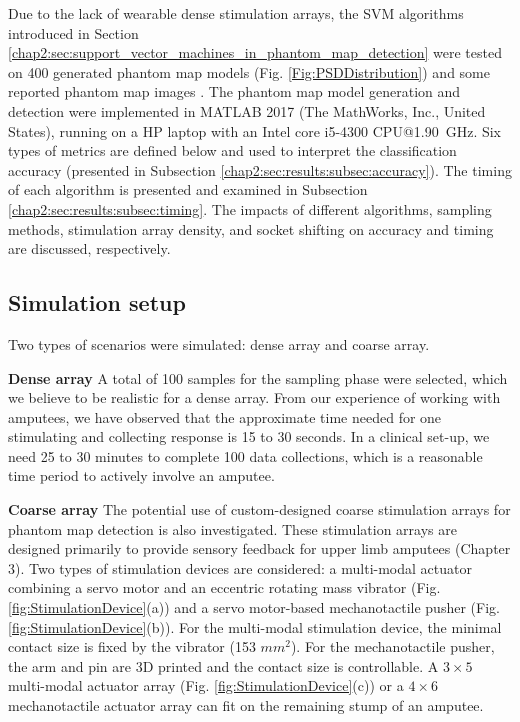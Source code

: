Due to the lack of wearable dense stimulation arrays, the SVM algorithms introduced in Section \ref{chap2:sec:support_vector_machines_in_phantom_map_detection} were tested on 400 generated phantom map models (Fig. \ref{Fig:PSDDistribution}) and some reported phantom map images \cite{antfolk2012sensory, chai2015characterization,bjorkman2016sensory}.
The phantom map model generation and detection were implemented in MATLAB 2017 (The MathWorks, Inc., United States), running on a HP laptop with an Intel core i5-4300 CPU@\SI{1.90}{GHz}.
Six types of metrics are defined below and used to interpret the classification accuracy (presented in Subsection \ref{chap2:sec:results:subsec:accuracy}). The timing of each algorithm is presented and examined in Subsection \ref{chap2:sec:results:subsec:timing}. 
The  impacts of different algorithms, sampling methods,  stimulation array density, and socket shifting on accuracy and timing are discussed, respectively.


\subsection{Simulation setup}
Two types of scenarios were simulated: dense array and coarse array.

\textbf{Dense array} 
A total of 100 samples for the sampling phase were selected, which we believe to be realistic for a dense array.
From our experience of working with amputees, we have observed that the approximate time needed for one stimulating and collecting response is 15 to 30 seconds. In a clinical set-up, we need 25 to 30 minutes to complete 100 data collections, which is a reasonable time period to actively involve an amputee. 

\textbf{Coarse array} 
The potential use of custom-designed coarse stimulation arrays for phantom map detection is also investigated. These stimulation arrays are designed primarily to provide sensory feedback for upper limb amputees (Chapter 3). Two types of stimulation devices are considered: a multi-modal actuator combining a servo motor and an eccentric rotating mass vibrator (Fig. \ref{fig:StimulationDevice}(a)) and a servo motor-based mechanotactile pusher (Fig. \ref{fig:StimulationDevice}(b)).  For the multi-modal stimulation device, the minimal contact size is fixed by the vibrator (153 $mm^2$).  For the mechanotactile pusher,  the arm and pin are 3D printed and the contact size is controllable.  A $3 \times 5$ multi-modal actuator array (Fig. \ref{fig:StimulationDevice}(c)) \cite{li2016miniature} or a $4 \times 6$ mechanotactile actuator array can fit on the remaining stump of an amputee.



